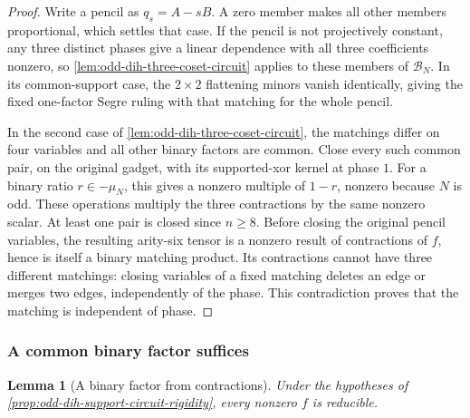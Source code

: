 \documentclass[11pt,letterpaper,onecolumn]{article}
\theoremstyle{plain}
\newtheorem{lemma}[lemma]{Lemma}
\theoremstyle{definition}
\theoremstyle{remark}
\begin{document}
	\begin{proof}
		Write a pencil as \(q_s=A-sB\).  A zero member makes all other members
		proportional, which settles that case.  If the pencil is not projectively
		constant, any three distinct phases give a linear dependence with all three
		coefficients nonzero,
		so \cref{lem:odd-dih-three-coset-circuit} applies to these members of
		\(\mathcal B_N\).  In its common-support
		case, the \(2\times2\) flattening minors vanish identically, giving the fixed
		one-factor Segre ruling with that matching for the whole pencil.
		
		In the second case of \cref{lem:odd-dih-three-coset-circuit}, the matchings
		differ on four variables and all other binary factors are common.  Close every such common pair, on the original gadget,
		with its supported-xor kernel at phase \(1\).  For a binary ratio
		\(r\in-\mu_N\), this gives a nonzero multiple of \(1-r\), nonzero because
		\(N\) is odd.  These operations multiply the three contractions by the same
		nonzero scalar.  At least one pair is closed since \(n\ge8\).  Before
		closing the original pencil variables, the resulting arity-six tensor is a
		nonzero result of contractions of \(f\), hence is itself a binary matching
		product.  Its contractions cannot have three different matchings: closing variables
		of a fixed matching deletes an edge or merges two edges, independently of
		the phase.  This contradiction proves that the matching is independent of phase.
	\end{proof}
	
	\subsubsection{A common binary factor suffices}
	\label{subsec:odd-dih-cross-sector}
	
	\begin{lemma}[A binary factor from contractions]
		\label{lem:odd-dih-common-binary-factor}
		Under the hypotheses of \cref{prop:odd-dih-support-circuit-rigidity}, every
		nonzero \(f\) is reducible.
	\end{lemma}
	
\end{document}
